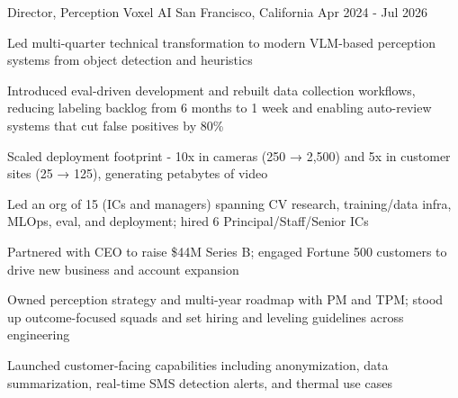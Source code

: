 \vspace{-3mm}

\begin{cventries}

  \cventry
	{Director, Perception} %
	{Voxel AI} %
	{San Francisco, California} %
	{Apr 2024 - Jul 2026} %
	{
		\begin{cvitems}
		\item {Led multi-quarter technical transformation to modern VLM-based perception systems from object detection and heuristics}
		\item {Introduced eval-driven development and rebuilt data collection workflows, reducing labeling backlog from 6 months to 1 week and enabling auto-review systems that cut false positives by 80\%}
		\item {Scaled deployment footprint - 10x in cameras (250 → 2,500) and 5x in customer sites (25 → 125), generating petabytes of video}
		\item {Led an org of 15 (ICs and managers) spanning CV research, training/data infra, MLOps, eval, and deployment; hired 6 Principal/Staff/Senior ICs}
		\item {Partnered with CEO to raise \$44M Series B; engaged Fortune 500 customers to drive new business and account expansion}
		\item {Owned perception strategy and multi-year roadmap with PM and TPM; stood up outcome-focused squads and set hiring and leveling guidelines across engineering}
		\item {Launched customer-facing capabilities including anonymization, data summarization, real-time SMS detection alerts, and thermal use cases}
		\end{cvitems}
	}


\end{cventries}
